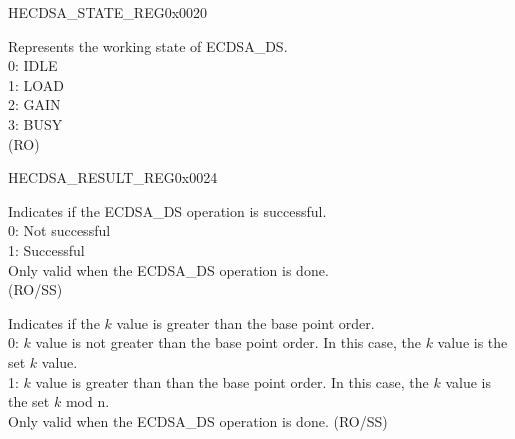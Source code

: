 \begin{register}{H}{ECDSA\_STATE\_REG}{0x0020}\label{regdesc:ECDSASTATEREG}
%
%
\regnewline%
\begin{regdesc}\begin{reglist}
\label{fielddesc:ECDSABUSY}\item [ECDSA\_BUSY] Represents the working state of ECDSA\_DS.\\
0: IDLE\\
1: LOAD\\
2: GAIN\\
3: BUSY\\
(RO)
\end{reglist}\end{regdesc}
\end{register}


\begin{register}{H}{ECDSA\_RESULT\_REG}{0x0024}\label{regdesc:ECDSARESULTREG}
%
%
%
\regnewline%
\begin{regdesc}\begin{reglist}
\label{fielddesc:ECDSAOPERATIONRESULT}\item [ECDSA\_OPERATION\_RESULT] Indicates if the ECDSA\_DS operation is successful.\\
0: Not successful\\
1: Successful\\
Only valid when the ECDSA\_DS operation is done. \\
(RO/SS)
\label{fielddesc:ECDSAKVALUEWARNING}\item [ECDSA\_K\_VALUE\_WARNING] Indicates if the $k$ value is greater than the base point order.\\
0: $k$ value is not greater than the base point order. In this case, the $k$ value is the set $k$ value.\\
1: $k$ value is greater than than the base point order. In this case, the $k$ value is the set $k$ mod n.\\
Only valid when the ECDSA\_DS operation is done. (RO/SS)
\end{reglist}\end{regdesc}
\end{register}


